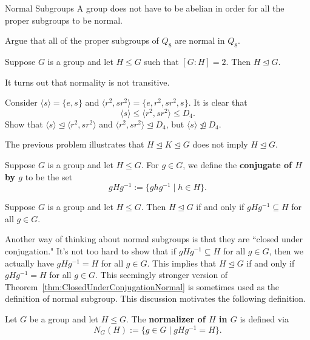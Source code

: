 \begin{section}{Normal Subgroups}
A group does not have to be abelian in order for all the proper subgroups to be normal.

\begin{problem}
Argue that all of the proper subgroups of $Q_8$ are normal in $Q_8$. 
\end{problem}

\begin{theorem}\label{thm:index2}
Suppose $G$ is a group and let $H\leq G$ such that $[G:H]=2$.  Then $H\trianglelefteq G$.
\end{theorem}

It turns out that normality is not transitive.

\begin{problem}
Consider $\langle s\rangle=\{e,s\}$ and $\langle r^2,sr^2\rangle =\{e,r^2,sr^2,s\}$. It is clear that
\[
\langle s\rangle\leq \langle r^2,sr^2\rangle\leq D_4.
\]
Show that $\langle s\rangle\trianglelefteq \langle r^2,sr^2\rangle$ and $\langle r^2,sr^2\rangle\trianglelefteq D_4$, but $\langle s\rangle\not\trianglelefteq D_4$.
\end{problem}

The previous problem illustrates that $H\trianglelefteq K \trianglelefteq G$ does not imply $H\trianglelefteq G$.

\begin{definition}
Suppose $G$ is a group and let $H\leq G$. For $g\in G$, we define the \textbf{conjugate of $H$ by $g$} to be the set
\[
gHg^{-1}:=\{ghg^{-1}\mid h\in H\}.
\]
\end{definition}

\begin{theorem}\label{thm:ClosedUnderConjugationNormal}
Suppose $G$ is a group and let $H\leq G$.  Then $H\trianglelefteq G$ if and only if $gHg^{-1}\subseteq H$ for all $g\in G$.
\end{theorem}

Another way of thinking about normal subgroups is that they are ``closed under conjugation." It's not too hard to show that if $gHg^{-1}\subseteq H$ for all $g\in G$, then we actually have $gHg^{-1}=H$ for all $g\in G$.  This implies that $H\trianglelefteq G$ if and only if $gHg^{-1}=H$ for all $g\in G$. This seemingly stronger version of Theorem~\ref{thm:ClosedUnderConjugationNormal} is sometimes used as the definition of normal subgroup. This discussion motivates the following definition.

\begin{definition}
Let $G$ be a group and let $H\leq G$.  The \textbf{normalizer of $H$ in $G$} is defined via
\[
N_G(H):=\{g\in G\mid gHg^{-1}=H\}.
\]
\end{definition}


\end{section}
